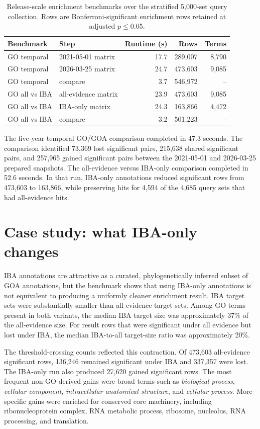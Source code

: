 \documentclass[11pt]{article}
\begin{document}
\begin{table}[t]
\centering
\caption{Release-scale enrichment benchmarks over the stratified 5,000-set query collection. Rows are Bonferroni-significant enrichment rows retained at adjusted $p \le 0.05$.}
\label{tab:benchmarks}
\begin{tabular}{llrrr}
\toprule
Benchmark & Step & Runtime (s) & Rows & Terms \\
\midrule
GO temporal & 2021-05-01 matrix & 17.7 & 289,007 & 8,790 \\
GO temporal & 2026-03-25 matrix & 24.7 & 473,603 & 9,085 \\
GO temporal & compare & 3.7 & 546,972 & -- \\
\midrule
GO all vs IBA & all-evidence matrix & 23.9 & 473,603 & 9,085 \\
GO all vs IBA & IBA-only matrix & 24.3 & 163,866 & 4,472 \\
GO all vs IBA & compare & 3.2 & 501,223 & -- \\
\bottomrule
\end{tabular}
\end{table}

The five-year temporal GO/GOA comparison completed in 47.3 seconds. The comparison identified 73,369 lost significant pairs, 215,638 shared significant pairs, and 257,965 gained significant pairs between the 2021-05-01 and 2026-03-25 prepared snapshots. The all-evidence versus IBA-only comparison completed in 52.6 seconds. In that run, IBA-only annotations reduced significant rows from 473,603 to 163,866, while preserving hits for 4,594 of the 4,685 query sets that had all-evidence hits.

\section{Case study: what IBA-only changes}

IBA annotations are attractive as a curated, phylogenetically inferred subset of GOA annotations, but the benchmark shows that using IBA-only annotations is not equivalent to producing a uniformly cleaner enrichment result. IBA target sets were substantially smaller than all-evidence target sets. Among GO terms present in both variants, the median IBA target size was approximately 37\% of the all-evidence size. For result rows that were significant under all evidence but lost under IBA, the median IBA-to-all target-size ratio was approximately 20\%.

The threshold-crossing counts reflected this contraction. Of 473,603 all-evidence significant rows, 136,246 remained significant under IBA and 337,357 were lost. The IBA-only run also produced 27,620 gained significant rows. The most frequent non-GO-derived gains were broad terms such as \emph{biological process}, \emph{cellular component}, \emph{intracellular anatomical structure}, and \emph{cellular process}. More specific gains were enriched for conserved core machinery, including ribonucleoprotein complex, RNA metabolic process, ribosome, nucleolus, RNA processing, and translation.
\end{document}
